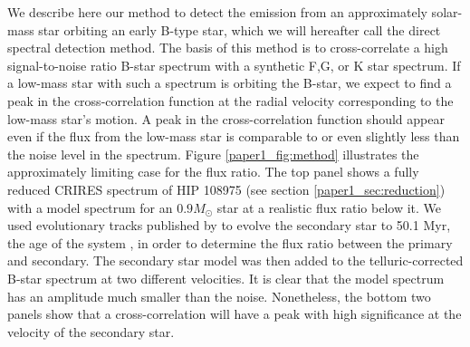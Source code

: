 We describe here our method to detect the emission from an
approximately solar-mass star orbiting an early B-type star, which we
will hereafter call the direct spectral detection method. The basis of
this method is to cross-correlate a high signal-to-noise ratio B-star
spectrum with a synthetic F,G, or K star spectrum. If a low-mass star
with such a spectrum is orbiting the B-star, we expect to find a peak
in the cross-correlation function at the radial velocity corresponding to
the low-mass star's motion. A peak in the cross-correlation
function should appear even if the
flux from the low-mass star is comparable to or even slightly less than the noise level in the
spectrum. Figure \ref{paper1_fig:method} illustrates the approximately limiting
case for the flux ratio. The top panel shows a fully reduced CRIRES spectrum of HIP 108975 (see section \ref{paper1_sec:reduction}) with a model spectrum for an $0.9 M_{\odot}$ star at a realistic flux ratio below it. We used
evolutionary tracks published by \cite{Landin2008} to evolve the secondary star
to 50.1 Myr, the age of the system \citep{Tetzlaff2010}, in order to determine the flux
ratio between the primary and secondary. The secondary star model was then added to
the telluric-corrected B-star spectrum at two different velocities. It is clear that the model spectrum has an amplitude much smaller
than the noise.  Nonetheless, the bottom two panels show that a cross-correlation will
have a peak with high significance at the velocity of the secondary star.



